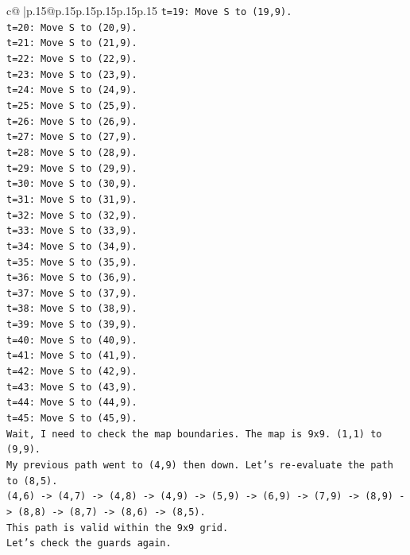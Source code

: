 \documentclass{article}
\begin{document}
{\begin{supertabular}{c@{$\;$}|p{.15\linewidth}@{}p{.15\linewidth}p{.15\linewidth}p{.15\linewidth}p{.15\linewidth}p{.15\linewidth}}
{{{\texttt{t=19: Move S to (19,9).} \\
\texttt{t=20: Move S to (20,9).} \\
\texttt{t=21: Move S to (21,9).} \\
\texttt{t=22: Move S to (22,9).} \\
\texttt{t=23: Move S to (23,9).} \\
\texttt{t=24: Move S to (24,9).} \\
\texttt{t=25: Move S to (25,9).} \\
\texttt{t=26: Move S to (26,9).} \\
\texttt{t=27: Move S to (27,9).} \\
\texttt{t=28: Move S to (28,9).} \\
\texttt{t=29: Move S to (29,9).} \\
\texttt{t=30: Move S to (30,9).} \\
\texttt{t=31: Move S to (31,9).} \\
\texttt{t=32: Move S to (32,9).} \\
\texttt{t=33: Move S to (33,9).} \\
\texttt{t=34: Move S to (34,9).} \\
\texttt{t=35: Move S to (35,9).} \\
\texttt{t=36: Move S to (36,9).} \\
\texttt{t=37: Move S to (37,9).} \\
\texttt{t=38: Move S to (38,9).} \\
\texttt{t=39: Move S to (39,9).} \\
\texttt{t=40: Move S to (40,9).} \\
\texttt{t=41: Move S to (41,9).} \\
\texttt{t=42: Move S to (42,9).} \\
\texttt{t=43: Move S to (43,9).} \\
\texttt{t=44: Move S to (44,9).} \\
\texttt{t=45: Move S to (45,9).} \\
\texttt{Wait, I need to check the map boundaries. The map is 9x9. (1,1) to (9,9).} \\
\texttt{My previous path went to (4,9) then down. Let's re{-}evaluate the path to (8,5).} \\
\texttt{(4,6) {-}> (4,7) {-}> (4,8) {-}> (4,9) {-}> (5,9) {-}> (6,9) {-}> (7,9) {-}> (8,9) {-}> (8,8) {-}> (8,7) {-}> (8,6) {-}> (8,5).} \\
\texttt{This path is valid within the 9x9 grid.} \\
\texttt{Let's check the guards again.} \\
}}}
\end{supertabular}}
\end{document}
